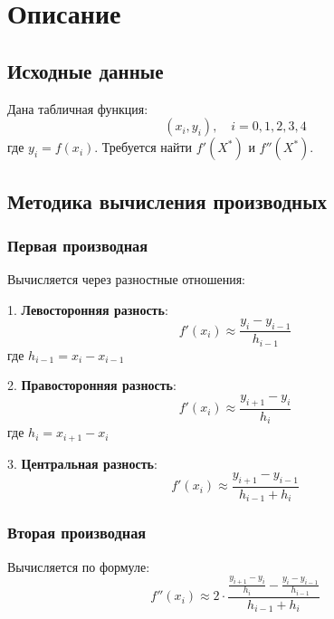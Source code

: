 
\section*{Описание}

\subsection*{Исходные данные}
Дана табличная функция:
\[ (x_i, y_i), \quad i = 0,1,2,3,4 \]
где $y_i = f(x_i)$. Требуется найти $f'(X^*)$ и $f''(X^*)$.

\subsection*{Методика вычисления производных}

\subsubsection*{Первая производная}
Вычисляется через разностные отношения:

1. \textbf{Левосторонняя разность}:
\[ f'(x_i) \approx \frac{y_i - y_{i-1}}{h_{i-1}} \]
где $h_{i-1} = x_i - x_{i-1}$

2. \textbf{Правосторонняя разность}:
\[ f'(x_i) \approx \frac{y_{i+1} - y_i}{h_i} \]
где $h_i = x_{i+1} - x_i$

3. \textbf{Центральная разность}:
\[ f'(x_i) \approx \frac{y_{i+1} - y_{i-1}}{h_{i-1} + h_i} \]

\subsubsection*{Вторая производная}
Вычисляется по формуле:
\[ f''(x_i) \approx 2 \cdot \frac{\frac{y_{i+1} - y_i}{h_i} - \frac{y_i - y_{i-1}}{h_{i-1}}}{h_{i-1} + h_i} \]

